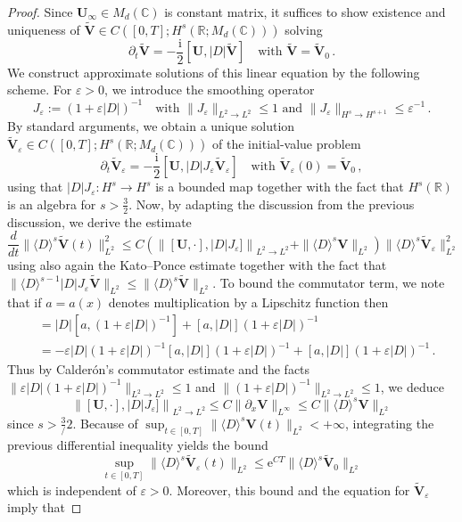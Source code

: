 \documentclass[11pt,reqno]{amsart}
\theoremstyle{definition}
\theoremstyle{remark}
\theoremstyle{remark}
\numberwithin{equation}{section}
\newcommand{\C}{\mathbb{C}}
\newcommand{\R}{\mathbb{R}}
\newcommand{\pt}{\partial}
\newcommand{\be}{\begin{equation}}
\newcommand{\ee}{\end{equation}}
\newcommand{\eps}{\varepsilon}
\newcommand{\ii}{\mathrm{i}}
\newcommand{\eu}{\mathrm{e}}
\newcommand{\Vb}{\mathbf{V}}
\newcommand{\Ub}{\mathbf{U}}
\newcommand{\Dsr}{\langle D \rangle}
\begin{document}
\begin{appendix}
\begin{proof}
Since $\Ub_\infty \in M_d(\C)$ is constant matrix, it suffices to show existence and uniqueness of $\widetilde{\Vb} \in C([0,T]; H^s(\R; M_d(\C)))$ solving
\be
\pt_t \widetilde{\Vb} = -\frac{\ii}{2} [\Ub, |D| \widetilde{\Vb}] \quad \mbox{with $\widetilde{\Vb} = \widetilde{\Vb}_0$} \, .
\ee
We construct approximate solutions of this linear equation by the following scheme. For $\eps > 0$, we introduce the smoothing operator
$$
J_\eps :=  (1+\eps |D|)^{-1} \quad \mbox{with $\|J_\eps \|_{L^2 \to L^2} \leq 1$ and $\| J_\eps \|_{H^s \to H^{s+1}} \leq \eps^{-1}$} \, .
$$
By standard arguments, we obtain a unique solution $\widetilde{\Vb}_\eps \in C([0,T]; H^s(\R; M_d(\C)))$ of the initial-value problem
$$
\pt_t \widetilde{\Vb}_\eps = -\frac{\ii}{2} [\Ub, |D| J_\eps \widetilde{\Vb}_\eps] \quad \mbox{with $\widetilde{\Vb}_\eps(0) = \widetilde{\Vb}_0$} \, ,
$$
using that $|D| J_\eps : H^s \to H^s$ is a bounded map together with the fact that $H^s(\R)$ is an algebra for $s > \frac{3}{2}$. Now, by adapting the discussion from the previous discussion, we derive the estimate
$$
\frac{d}{dt} \| \Dsr^s \widetilde{\Vb}(t) \|_{L^2}^2 \leq  C \left ( \left \| [\Ub, \cdot], |D|J_\eps ] \right \|_{L^2 \to L^2} + \| \Dsr^s \Vb\|_{L^2} \right ) \| \Dsr^s \widetilde{\Vb}_\eps \|_{L^2}^2
$$
using also again the Kato--Ponce estimate together with the fact that $\|\Dsr^{s-1} |D| J_\eps \widetilde{\Vb} \|_{L^2} \leq \| \Dsr^s \widetilde{\Vb} \|_{L^2}$. To bound the commutator term, we note that if $a=a(x)$ denotes multiplication by a Lipschitz function then
\begin{align*}
[a, |D| J_\eps] & = |D| [a, (1+\eps |D|)^{-1}] + [a,|D|] (1+\eps |D|)^{-1} \\
& = -\eps |D| (1+\eps |D|)^{-1} [a,|D|] (1+\eps |D|)^{-1} + [a,|D|] (1+\eps |D|)^{-1} \, .
\end{align*}
Thus by Calder\'on's commutator estimate and the facts $\| \eps |D|(1+\eps |D|)^{-1} \|_{L^2 \to L^2} \leq 1$ and $\| (1+\eps |D|)^{-1} \|_{L^2 \to L^2} \leq 1$, we deduce
$$
\left \| [\Ub, \cdot], |D|J_\eps ] \right \|_{L^2 \to L^2} \leq C \| \pt_x \Vb \|_{L^\infty} \leq C \| \Dsr^s \Vb \|_{L^2} 
$$
since $s > \frac 3/2$. Because of $\sup_{t \in [0,T]} \| \Dsr^s \Vb(t) \|_{L^2} < +\infty$, integrating the previous differential inequality yields the bound
\be \label{ineq:lwp2_1}
\sup_{t \in [0,T]} \| \Dsr^s \widetilde{\Vb}_\eps(t) \|_{L^2} \leq  \eu^{CT}  \| \Dsr^s \widetilde{\Vb}_0 \|_{L^2}
\ee
which is independent of $\eps >0$. Moreover, this bound and the equation for $\widetilde{\Vb}_\eps$ imply that

\end{proof}
\end{appendix}
\end{document}
